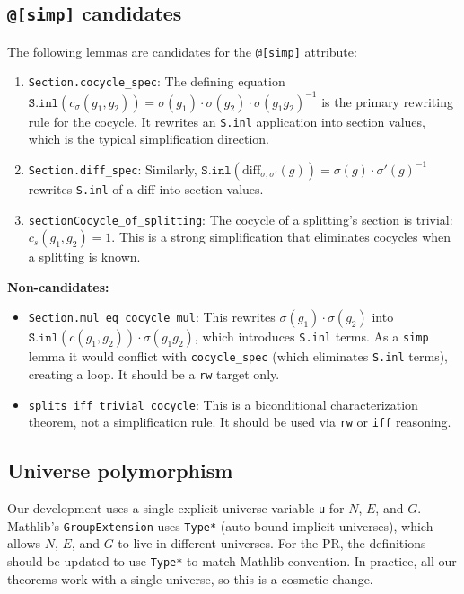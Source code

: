 \documentclass[11pt]{article}
\begin{document}
\subsection{\texttt{@[simp]} candidates}\label{sec:simp}

The following lemmas are candidates for the \texttt{@[simp]} attribute:

\begin{enumerate}[nosep]
\item \texttt{Section.cocycle\_spec}: The defining equation
  $\texttt{S.inl}(c_\sigma(g_1, g_2)) = \sigma(g_1) \cdot \sigma(g_2) \cdot
  \sigma(g_1 g_2)^{-1}$ is the primary rewriting rule for the cocycle. It rewrites
  an \texttt{S.inl} application into section values, which is the typical simplification
  direction.

\item \texttt{Section.diff\_spec}: Similarly, $\texttt{S.inl}(\mathrm{diff}_{\sigma,\sigma'}(g))
  = \sigma(g) \cdot \sigma'(g)^{-1}$ rewrites \texttt{S.inl} of a diff into section
  values.

\item \texttt{sectionCocycle\_of\_splitting}: The cocycle of a splitting's section is
  trivial: $c_s(g_1, g_2) = 1$. This is a strong simplification that eliminates cocycles
  when a splitting is known.
\end{enumerate}

\textbf{Non-candidates:}
\begin{itemize}[nosep]
\item \texttt{Section.mul\_eq\_cocycle\_mul}: This rewrites $\sigma(g_1) \cdot \sigma(g_2)$
  into $\texttt{S.inl}(c(g_1,g_2)) \cdot \sigma(g_1 g_2)$, which introduces
  \texttt{S.inl} terms. As a \texttt{simp} lemma it would conflict with
  \texttt{cocycle\_spec} (which eliminates \texttt{S.inl} terms), creating a loop.
  It should be a \texttt{rw} target only.

\item \texttt{splits\_iff\_trivial\_cocycle}: This is a biconditional characterization
  theorem, not a simplification rule. It should be used via \texttt{rw} or \texttt{iff}
  reasoning.
\end{itemize}

\subsection{Universe polymorphism}

Our development uses a single explicit universe variable \texttt{u} for $N$, $E$, and $G$.
Mathlib's \texttt{GroupExtension} uses \texttt{Type*} (auto-bound implicit universes),
which allows $N$, $E$, and $G$ to live in different universes. For the PR, the definitions
should be updated to use \texttt{Type*} to match Mathlib convention. In practice, all our
theorems work with a single universe, so this is a cosmetic change.
\end{document}
